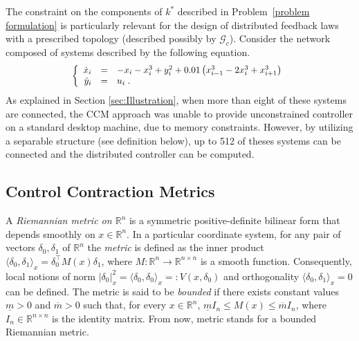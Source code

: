 \documentclass[10pt,twocolumn,twoside]{IEEEtran}
\newcounter{para}
\newcommand\mypara{\par}
\theoremstyle{plain}
\theoremstyle{definition}
\theoremstyle{remark}
\begin{document}
\mypara The constraint on the components of $k^\ast$ described in Problem~\ref{problem formulation} is particularly relevant for the design of distributed feedback laws with a prescribed topology (described possibly by $\mathscr{G}_c$). Consider the network composed of systems described by the following equation.
\begin{equation}\label{eq:example}
	\scalebox{0.95}{$\left\{\begin{array}{rcl}
		\dot{x}_i&=&-x_i-x_i^3+y_i^2 + 0.01\left(x_{i-1}^3 - 2x_i^3 +x_{i+1}^3\right)\\
		\dot{y}_i&=&u_i\;.
	\end{array}\right.$}
\end{equation}
As explained in Section \ref{sec:Illustration}, when more than eight of these systems are connected, the CCM approach was unable to provide unconstrained controller on a standard desktop machine, due to memory constraints. However, by utilizing a separable structure (see definition below), up to 512 of theses systems can be connected and the distributed controller can be computed. 

\subsection{Control Contraction Metrics}\label{sec:background}

\mypara A \emph{Riemannian metric on $\mathbb{R}^n$} is a symmetric positive-definite bilinear form that depends smoothly on $x\in\mathbb{R}^n$. In a particular coordinate system, for any pair of vectors $\delta_0,\delta_1$ of $\mathbb{R}^n$ the \emph{metric} is defined as the inner product $\langle\delta_0,\delta_{ 1}\rangle_x=\delta_0^\top M(x)\delta_1$, where $M:\mathbb{R}^n\to\mathbb{R}^{n\times n}$ is a smooth function. Consequently, local notions of norm $|\delta_0|_x^2=\langle\delta_0,\delta_0\rangle_x=:V(x,\delta_0)$ and orthogonality $\langle\delta_0,\delta_1\rangle_x=0$ can be defined. The metric is said to be \emph{bounded} if there exists constant values $\underline{m}>0$ and $\overline{m}>0$ such that, for every $x\in\mathbb{R}^n$, $\underline{m}I_n\leq M(x)\leq \overline{m}I_n$, where $I_n\in\mathbb{R}^{n\times n}$ is the identity matrix. From now, metric stands for a bounded Riemannian metric.
\end{document}
